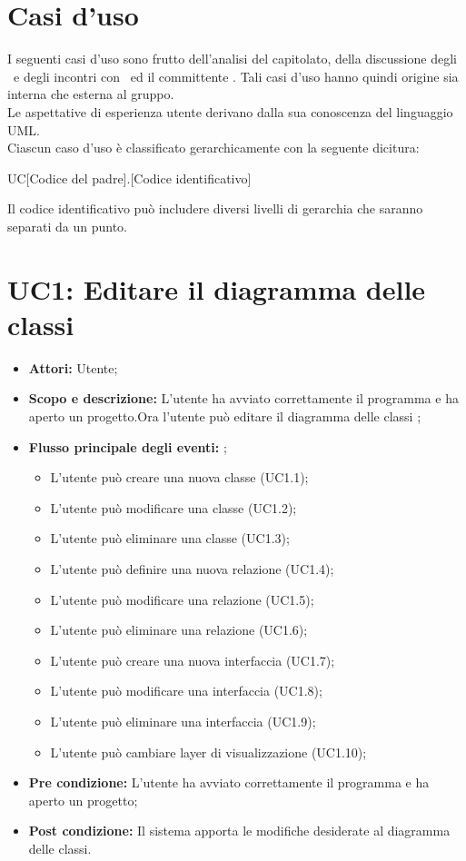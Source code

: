 \documentclass[../AnalisiDeiRequisiti.tex]{subfiles}
\begin{document}
	\section{Casi d'uso }
	I seguenti casi d'uso sono frutto dell'analisi del capitolato, della discussione degli
	\analisti\ e degli incontri con	\proponente\ ed il committente \vardanega.
	Tali casi d'uso hanno quindi origine sia interna che esterna al gruppo.\\
	Le aspettative di esperienza utente derivano dalla sua conoscenza del
	linguaggio UML.\\
	Ciascun caso d'uso è classificato gerarchicamente con la seguente dicitura:
	\begin{center}
		UC[Codice del padre].[Codice identificativo]
	\end{center}
	Il codice identificativo può includere diversi livelli di gerarchia che saranno
	separati da un punto.
	\section{UC1: Editare il diagramma delle classi}
	\begin{itemize}
		\item \textbf{Attori: }Utente;
		\item \textbf{Scopo e descrizione: }L'utente ha avviato correttamente il programma e ha aperto un progetto.Ora l'utente può editare il diagramma delle classi ;
		
		\item \textbf{Flusso principale degli eventi: } ;
		\begin{itemize}
			\item L'utente può creare una nuova classe (UC1.1);
			\item L'utente può modificare una classe (UC1.2);
			\item L'utente può eliminare una classe (UC1.3);
			\item L'utente può definire una nuova relazione (UC1.4);
			\item L'utente può modificare una relazione (UC1.5);
			\item L'utente può eliminare una relazione (UC1.6);
			\item L'utente può creare una nuova interfaccia (UC1.7);
			\item L'utente può modificare una interfaccia (UC1.8);
			\item L'utente può eliminare una interfaccia (UC1.9);
			\item L'utente può cambiare layer di visualizzazione (UC1.10);
		\end{itemize}
		\item \textbf{Pre condizione: }L'utente ha avviato correttamente il programma e ha aperto un progetto;
		\item \textbf{Post condizione: }Il sistema apporta le modifiche desiderate al diagramma delle classi.
	\end{itemize}
	
\end{document}

